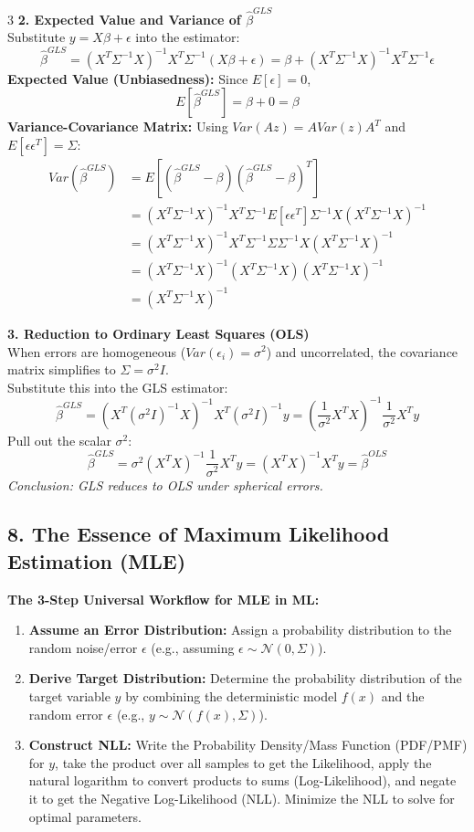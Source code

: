 \documentclass[10pt,landscape]{article}
\begin{document}
\begin{multicols*}{3}
\textbf{2. Expected Value and Variance of $\hat{\beta}^{GLS}$} \\
Substitute $y = X\beta + \epsilon$ into the estimator:
$$ \hat{\beta}^{GLS} = (X^T \Sigma^{-1} X)^{-1} X^T \Sigma^{-1} (X\beta + \epsilon) = \beta + (X^T \Sigma^{-1} X)^{-1} X^T \Sigma^{-1} \epsilon $$
\textbf{Expected Value (Unbiasedness):} Since $E[\epsilon] = 0$, 
$$ E[\hat{\beta}^{GLS}] = \beta + 0 = \beta $$
\textbf{Variance-Covariance Matrix:} Using $Var(Az) = A Var(z) A^T$ and $E[\epsilon \epsilon^T] = \Sigma$:
\begin{align*}
Var(\hat{\beta}^{GLS}) &= E[(\hat{\beta}^{GLS} - \beta)(\hat{\beta}^{GLS} - \beta)^T] \\
&= (X^T \Sigma^{-1} X)^{-1} X^T \Sigma^{-1} E[\epsilon \epsilon^T] \Sigma^{-1} X (X^T \Sigma^{-1} X)^{-1} \\
&= (X^T \Sigma^{-1} X)^{-1} X^T \Sigma^{-1} \Sigma \Sigma^{-1} X (X^T \Sigma^{-1} X)^{-1} \\
&= (X^T \Sigma^{-1} X)^{-1} (X^T \Sigma^{-1} X) (X^T \Sigma^{-1} X)^{-1} \\
&= (X^T \Sigma^{-1} X)^{-1}
\end{align*}

\textbf{3. Reduction to Ordinary Least Squares (OLS)} \\
When errors are homogeneous ($Var(\epsilon_i) = \sigma^2$) and uncorrelated, the covariance matrix simplifies to $\Sigma = \sigma^2 I$. \\
Substitute this into the GLS estimator:
$$ \hat{\beta}^{GLS} = (X^T (\sigma^2 I)^{-1} X)^{-1} X^T (\sigma^2 I)^{-1} y = \left( \frac{1}{\sigma^2} X^T X \right)^{-1} \frac{1}{\sigma^2} X^T y $$
Pull out the scalar $\sigma^2$:
$$ \hat{\beta}^{GLS} = \sigma^2 (X^T X)^{-1} \frac{1}{\sigma^2} X^T y = (X^T X)^{-1} X^T y = \hat{\beta}^{OLS} $$
\textit{Conclusion: GLS reduces to OLS under spherical errors.}

\subsection*{8. The Essence of Maximum Likelihood Estimation (MLE)}

\textbf{The 3-Step Universal Workflow for MLE in ML:}
\begin{enumerate}
    \item \textbf{Assume an Error Distribution:} Assign a probability distribution to the random noise/error $\epsilon$ (e.g., assuming $\epsilon \sim \mathcal{N}(0, \Sigma)$).
    \item \textbf{Derive Target Distribution:} Determine the probability distribution of the target variable $y$ by combining the deterministic model $f(x)$ and the random error $\epsilon$ (e.g., $y \sim \mathcal{N}(f(x), \Sigma)$).
    \item \textbf{Construct NLL:} Write the Probability Density/Mass Function (PDF/PMF) for $y$, take the product over all samples to get the Likelihood, apply the natural logarithm to convert products to sums (Log-Likelihood), and negate it to get the Negative Log-Likelihood (NLL). Minimize the NLL to solve for optimal parameters.
\end{enumerate}


\end{multicols*}
\end{document}
